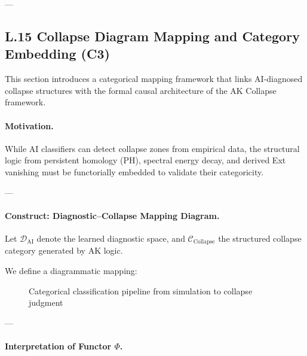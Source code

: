 \documentclass[11pt]{article}
\begin{document}
\begin{axiom}
\begin{axiom}
{{---

\subsection*{L.15 Collapse Diagram Mapping and Category Embedding (C3)}

This section introduces a categorical mapping framework that links AI-diagnosed collapse structures  
with the formal causal architecture of the AK Collapse framework.

\paragraph{Motivation.}
While AI classifiers can detect collapse zones from empirical data, the structural logic from persistent homology (PH),  
spectral energy decay, and derived Ext vanishing must be functorially embedded to validate their categoricity.

---

\paragraph{Construct: Diagnostic–Collapse Mapping Diagram.}

Let $\mathcal{D}_{\text{AI}}$ denote the learned diagnostic space,  
and $\mathcal{C}_{\text{Collapse}}$ the structured collapse category generated by AK logic.

We define a diagrammatic mapping:

\begin{figure}[htbp]
\centering

\caption{Categorical classification pipeline from simulation to collapse judgment}
\end{figure}



---

\paragraph{Interpretation of Functor $\Phi$.}

}}
\end{axiom}
\end{axiom}
\end{document}
